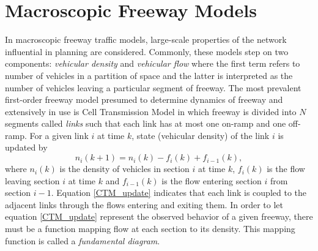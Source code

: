 \documentclass[twocolumn,10pt]{asme2e}
\begin{document}
\section{Macroscopic Freeway Models}
In macroscopic freeway traffic models, large-scale properties of the network influential in planning are considered. Commonly, these models step on two components: \emph{vehicular density} and \emph{vehicular flow} where the first term refers to number of vehicles in a partition of space and the latter is interpreted as the number of vehicles leaving a particular segment of freeway. 
The most prevalent first-order freeway model presumed to determine dynamics of freeway and extensively in use is Cell Transmission Model \cite{CTM} in which freeway is divided into $N$ segments called \emph{links}  such that each link has at most one on-ramp and one off-ramp. For a given link $i$ at time $k$, state (vehicular density) of the link $i$ is updated by 
\begin{equation} \label{CTM_update}
n_i(k+1) = n_i(k) - f_i(k) + f_{i-1}(k),
\end{equation}
where $n_i(k)$ is the density of vehicles in section $i$ at time $k$, $f_i(k)$ is the flow leaving section $i$ at time $k$ and  $f_{i-1}(k)$ is the flow entering section $i$ from section $i-1$. Equation \ref{CTM_update} indicates that each link is coupled to the adjacent links through the flows entering and exiting them. 
In order to let equation \ref{CTM_update} represent the observed behavior of a given freeway, there must be a function mapping flow at each section to its density. This mapping function is called a \textit{fundamental diagram}.
\end{document}
